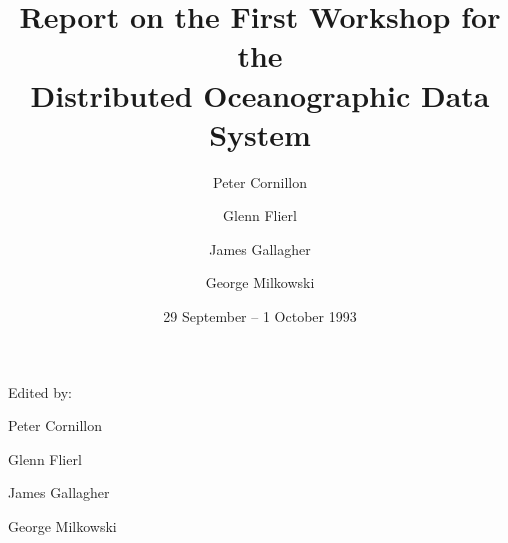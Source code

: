 \begin{titlepage}

\begin{latexonly}


\vbox{}
\vskip 1in
\begin{center}
\end{center}

\vskip 3in
\hskip 3in
Edited by:

\hskip 3.25in
Peter Cornillon

\hskip 3.25in
Glenn Flierl

\hskip 3.25in
James Gallagher

\hskip 3.25in
George Milkowski

\end{latexonly}

\begin{htmlonly}


\title{Report on the First Workshop for the \\
Distributed Oceanographic Data System}

\author{Peter Cornillon\\
\and Glenn Flierl\\
\and James Gallagher\\
\and George Milkowski}

\date{29 September -- 1 October 1993}

\maketitle

\end{htmlonly}

\end{titlepage}

\newpage

